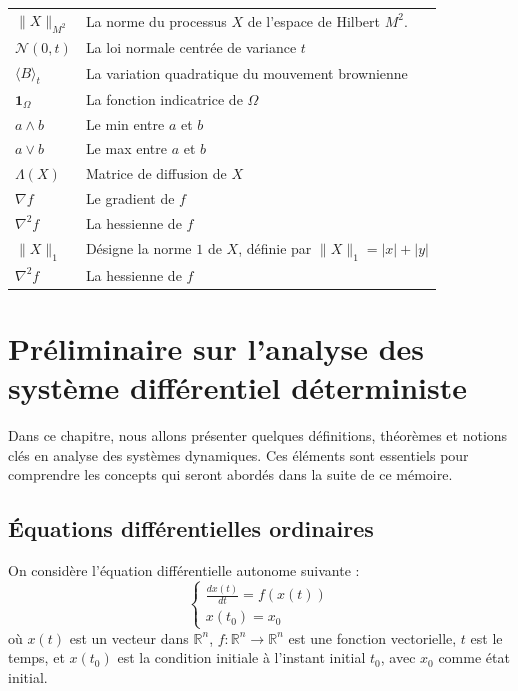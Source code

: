 \documentclass[12pt,a4paper]{report}%
\begin{document}
\begin{tabular}{ll}
  \\
  $\|X\|_{M^2}$ & La norme du processus $X$ de l'espace de Hilbert $M^2$.
  \\
  $\mathcal{N}(0,t)$ & La loi normale centrée de variance $t$
  \\
  $\langle B \rangle_t$ & La variation quadratique du mouvement brownienne
  \\
  \(\mathbf{1}_{\Omega}\)& La fonction indicatrice de \(\Omega\) 
  \\
  $a \wedge b $ &  Le min entre $a$ et $b$
  \\
  $a \vee b $ &  Le max entre $a$ et $b$
  \\
  $\Lambda(X)$ & Matrice de diffusion de $X$
  \\
  $\nabla f$ & Le gradient de $f$
  \\
  $\nabla^2 f$ & La hessienne de $f$
  \\
 $\|X\|_1$ & Désigne la norme $1$ de $X$, définie par $\|X\|_1 = |x| + |y|$
 \\
  $\nabla^2 f$ & La hessienne de $f$\\
  \hline 
  \hline
  \end{tabular}




\newpage
\chapter{Préliminaire sur l'analyse des système différentiel déterministe}
Dans ce chapitre, nous allons présenter quelques définitions, théorèmes et notions clés en analyse des systèmes dynamiques. Ces éléments sont essentiels pour comprendre les concepts qui seront abordés dans la suite de ce mémoire.
\section{Équations différentielles ordinaires }
On considère l'équation différentielle autonome suivante :
\begin{equation}\label{cauchy}
\begin{cases}
\frac{dx(t)}{dt} = f(x(t)) \\
x(t_0) = x_0
\end{cases}
\end{equation}
où \( x(t) \) est un vecteur dans \( \mathbb{R}^n \), \( f : \mathbb{R}^n \rightarrow \mathbb{R}^n \) est une fonction vectorielle, \( t \) est le temps, et \( x(t_0) \) est la condition initiale à l'instant initial \( t_0 \), avec \( x_0 \) comme état initial.
\end{document}
